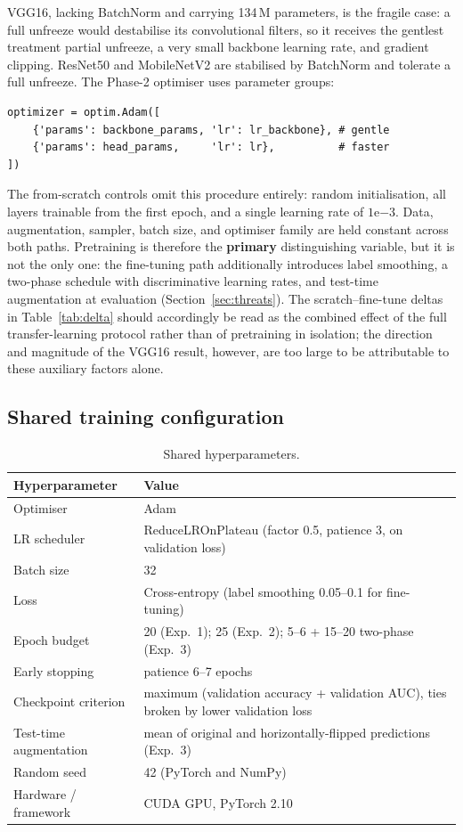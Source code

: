 \documentclass[11pt,a4paper]{article}
\numberwithin{figure}{section}
\numberwithin{table}{section}
\begin{document}
VGG16, lacking BatchNorm and carrying 134\,M parameters, is the fragile case: a full unfreeze would
destabilise its convolutional filters, so it receives the gentlest treatment partial unfreeze, a very
small backbone learning rate, and gradient clipping. ResNet50 and MobileNetV2 are stabilised by
BatchNorm and tolerate a full unfreeze. The Phase-2 optimiser uses parameter groups:

\begin{lstlisting}
optimizer = optim.Adam([
    {'params': backbone_params, 'lr': lr_backbone}, # gentle
    {'params': head_params,     'lr': lr},          # faster
])
\end{lstlisting}

The from-scratch controls omit this procedure entirely: random initialisation, all layers trainable from
the first epoch, and a single learning rate of $1\mathrm{e}{-3}$. Data, augmentation, sampler, batch
size, and optimiser family are held constant across both paths. Pretraining is therefore the
\textbf{primary} distinguishing variable, but it is not the only one: the fine-tuning path additionally
introduces label smoothing, a two-phase schedule with discriminative learning rates, and test-time
augmentation at evaluation (Section~\ref{sec:threats}). The scratch--fine-tune deltas in
Table~\ref{tab:delta} should accordingly be read as the combined effect of the full transfer-learning
protocol rather than of pretraining in isolation; the direction and magnitude of the VGG16 result,
however, are too large to be attributable to these auxiliary factors alone.

\subsection{Shared training configuration}
\begin{table}[H]
\centering
\caption{Shared hyperparameters.}
\label{tab:hyper}
\begin{tabularx}{\textwidth}{lX}
\toprule
Hyperparameter & Value \\
\midrule
Optimiser & Adam \\
LR scheduler & ReduceLROnPlateau (factor 0.5, patience 3, on validation loss) \\
Batch size & 32 \\
Loss & Cross-entropy (label smoothing 0.05--0.1 for fine-tuning) \\
Epoch budget & 20 (Exp.\ 1); 25 (Exp.\ 2); 5--6 + 15--20 two-phase (Exp.\ 3) \\
Early stopping & patience 6--7 epochs \\
Checkpoint criterion & maximum (validation accuracy + validation AUC), ties broken by lower validation loss \\
Test-time augmentation & mean of original and horizontally-flipped predictions (Exp.\ 3) \\
Random seed & 42 (PyTorch and NumPy) \\
Hardware / framework & CUDA GPU, PyTorch 2.10 \cite{pytorch} \\
\bottomrule
\end{tabularx}
\end{table}
\end{document}

